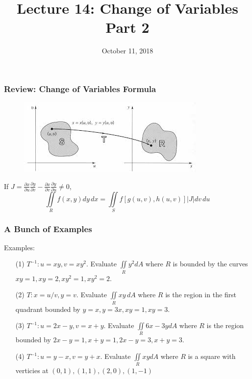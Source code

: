 \documentclass{beamer}
\title{Lecture 14: Change of Variables Part 2}
\date{October 11, 2018}
\begin{document}
	
\frame{\titlepage}


\begin{frame}
\frametitle{Review: Change of Variables Formula}
\begin{figure}
	
	\includegraphics[width=.9\textheight]{vmap.jpg}\\
	\hspace*{10pt}\hbox{}
\end{figure}
If $J = \frac{\partial x}{\partial u} \frac{\partial y}{\partial v}-	\frac{\partial x}{\partial v}\frac{\partial y}{\partial u} \neq 0$,
$$\iint\limits_{R} f(x,y)dy\,dx = \iint\limits_{S} f[g(u,v),h(u,v)] |J| dv\,du$$


\end{frame}

\begin{frame}
\frametitle{A Bunch of Examples}
Examples:
\begin{itemize}
	\item[(1)] $T^{-1}: u=xy,v=xy^2$. Evaluate $\iint\limits_{R} y^2 dA$ where $R$ is bounded by the curves $xy=1,xy=2,xy^2=1,xy^2=2$.
	\item[(2)]$T: x=u/v, y=v$. Evaluate $\iint\limits_{R} xy \,dA$ where $R$ is the region in the first quadrant bounded by $y=x,y=3x,xy=1,xy=3$.
	\item[(3)]$T^{-1}: u=2x-y,v=x+y$. Evaluate $\iint\limits_{R} 6x-3y dA$ where $R$ is the region bounded by $2x-y=1,x+y=1,2x-y=3,x+y=3$.
	\item[(4)]$T^{-1}: u=y-x,v=y+x$. Evaluate $\iint\limits_{R} xy dA$ where $R$ is a square with verticies at $(0,1),(1,1),(2,0),(1,-1)$
\end{itemize}
\end{frame}
\end{document}
